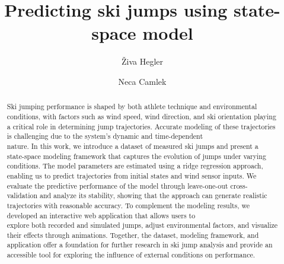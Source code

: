 \documentclass[sigconf,natbib=false, language=english]{acmart}
\begin{document}
\title[Ski Jumping Simulation]{Predicting ski jumps using state-space model}


\author{Živa Hegler}


\author{Neca Camlek}

\renewcommand{\shortauthors}{Ž. Hegler and N. Camlek}


\begin{abstract}

Ski jumping performance is shaped by both athlete technique and environmental 
conditions, with factors such as wind speed, wind direction, and ski orientation 
playing a critical role in determining jump trajectories. Accurate modeling of 
these trajectories is challenging due to the system’s dynamic and time-dependent\\ 
nature. In this work, we introduce a dataset of measured ski jumps and present a 
state-space modeling framework that captures the evolution of jumps under varying 
conditions. The model parameters are estimated using a ridge regression approach, 
enabling us to predict trajectories from initial states and wind sensor inputs. 
We evaluate the predictive performance of the model through leave-one-out cross-validation 
and analyze its stability, showing that the approach can generate realistic trajectories 
with reasonable accuracy. To complement the modeling results, we developed an interactive 
web application that allows users to \\
explore both recorded and simulated jumps, adjust 
environmental factors, and visualize their effects through animations. Together, the 
dataset, modeling framework, and application offer a foundation for further research in 
ski jump analysis and provide an accessible tool for exploring the influence of external 
conditions on performance.

\end{abstract}



\maketitle
\end{document}
